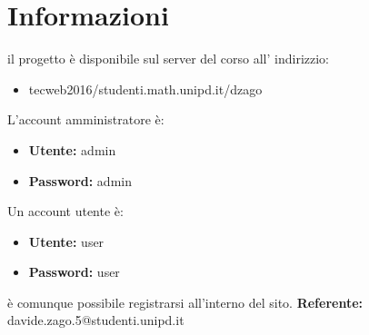 \section{Informazioni}
il progetto è disponibile sul server del corso all' indirizzio: 
\begin{itemize}
	\item tecweb2016/studenti.math.unipd.it/dzago
\end{itemize}
L'account amministratore è:
\begin{itemize}
    \item \textbf{Utente:} admin
    \item \textbf{Password:} admin	
\end{itemize}
Un account utente è:
\begin{itemize}
	\item \textbf{Utente:} user
	\item \textbf{Password:} user
\end{itemize}
è comunque possibile registrarsi all'interno del sito.\newline
\textbf{Referente:} davide.zago.5@studenti.unipd.it
